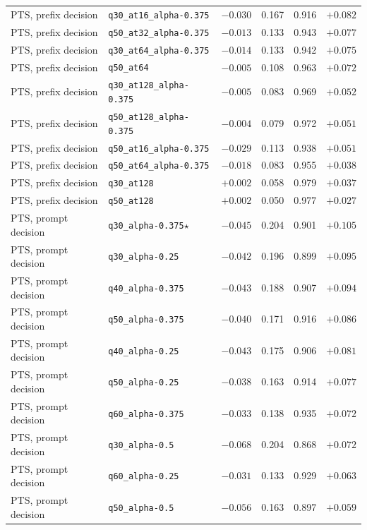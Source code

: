 {\begin{longtable}{l|l|c|cc|c}
PTS, prefix decision & \texttt{q30\_at16\_alpha-0.375} & $-0.030$ & 0.167 & 0.916 & $+0.082$ \\
PTS, prefix decision & \texttt{q50\_at32\_alpha-0.375} & $-0.013$ & 0.133 & 0.943 & $+0.077$ \\
PTS, prefix decision & \texttt{q30\_at64\_alpha-0.375} & $-0.014$ & 0.133 & 0.942 & $+0.075$ \\
PTS, prefix decision & \texttt{q50\_at64} & $-0.005$ & 0.108 & 0.963 & $+0.072$ \\
PTS, prefix decision & \texttt{q30\_at128\_alpha-0.375} & $-0.005$ & 0.083 & 0.969 & $+0.052$ \\
PTS, prefix decision & \texttt{q50\_at128\_alpha-0.375} & $-0.004$ & 0.079 & 0.972 & $+0.051$ \\
PTS, prefix decision & \texttt{q50\_at16\_alpha-0.375} & $-0.029$ & 0.113 & 0.938 & $+0.051$ \\
PTS, prefix decision & \texttt{q50\_at64\_alpha-0.375} & $-0.018$ & 0.083 & 0.955 & $+0.038$ \\
PTS, prefix decision & \texttt{q30\_at128} & $+0.002$ & 0.058 & 0.979 & $+0.037$ \\
PTS, prefix decision & \texttt{q50\_at128} & $+0.002$ & 0.050 & 0.977 & $+0.027$ \\
PTS, prompt decision & \texttt{q30\_alpha-0.375}$\star$ & $-0.045$ & 0.204 & 0.901 & $+0.105$ \\
PTS, prompt decision & \texttt{q30\_alpha-0.25} & $-0.042$ & 0.196 & 0.899 & $+0.095$ \\
PTS, prompt decision & \texttt{q40\_alpha-0.375} & $-0.043$ & 0.188 & 0.907 & $+0.094$ \\
PTS, prompt decision & \texttt{q50\_alpha-0.375} & $-0.040$ & 0.171 & 0.916 & $+0.086$ \\
PTS, prompt decision & \texttt{q40\_alpha-0.25} & $-0.043$ & 0.175 & 0.906 & $+0.081$ \\
PTS, prompt decision & \texttt{q50\_alpha-0.25} & $-0.038$ & 0.163 & 0.914 & $+0.077$ \\
PTS, prompt decision & \texttt{q60\_alpha-0.375} & $-0.033$ & 0.138 & 0.935 & $+0.072$ \\
PTS, prompt decision & \texttt{q30\_alpha-0.5} & $-0.068$ & 0.204 & 0.868 & $+0.072$ \\
PTS, prompt decision & \texttt{q60\_alpha-0.25} & $-0.031$ & 0.133 & 0.929 & $+0.063$ \\
PTS, prompt decision & \texttt{q50\_alpha-0.5} & $-0.056$ & 0.163 & 0.897 & $+0.059$ \\

\end{longtable}}
